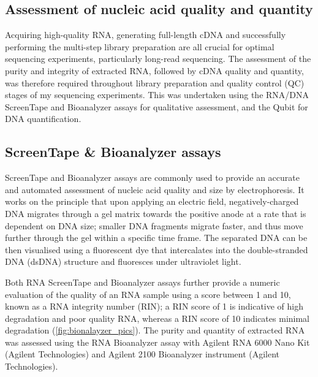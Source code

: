 \subsection{Assessment of nucleic acid quality and quantity}
Acquiring high-quality RNA, generating full-length cDNA and successfully performing the multi-step library preparation are all crucial for optimal sequencing experiments, particularly long-read sequencing. The assessment of the purity and integrity of extracted RNA, followed by cDNA quality and quantity, was therefore required throughout library preparation and quality control (QC) stages of my sequencing experiments. This was undertaken using the RNA/DNA ScreenTape and Bioanalyzer assays for qualitative assessment, and the Qubit for DNA quantification. 


\subsection{ScreenTape \& Bioanalyzer assays}
\label{section:ch2_bioanalyzer} 
ScreenTape and Bioanalyzer assays are commonly used to provide an accurate and automated assessment of nucleic acid quality and size by electrophoresis. It works on the principle that upon applying an electric field, negatively-charged DNA migrates through a gel matrix towards the positive anode at a rate that is dependent on DNA size; smaller DNA fragments migrate faster, and thus move further through the gel within a specific time frame. The separated DNA can be then visualised using a fluorescent dye that intercalates into the double-stranded DNA (dsDNA) structure and fluoresces under ultraviolet light. 

Both RNA ScreenTape and Bioanalyzer assays further provide a numeric evaluation of the quality of an RNA sample using a score between 1 and 10, known as a RNA integrity number (RIN); a RIN score of 1 is indicative of high degradation and poor quality RNA, whereas a RIN score of 10 indicates minimal degradation (\cref{fig:bionalayzer_pics}). The purity and quantity of extracted RNA was assessed using the RNA Bioanalyzer assay with Agilent RNA 6000 Nano Kit (Agilent Technologies) and Agilent 2100 Bioanalyzer instrument (Agilent Technologies). 

